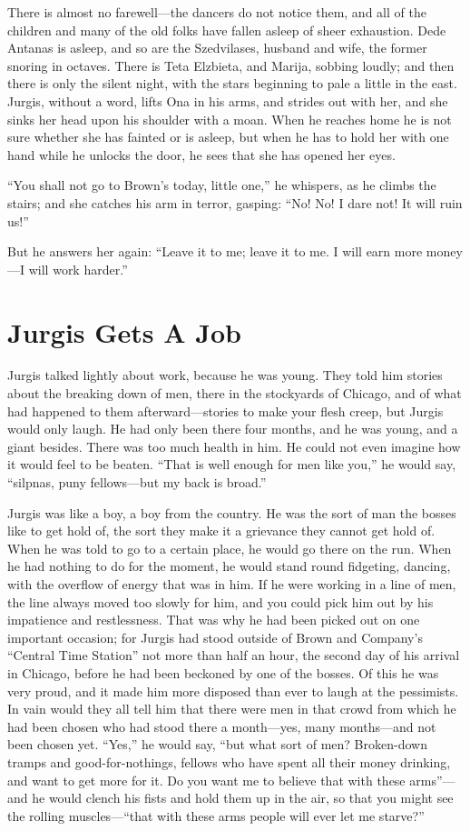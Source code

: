 \documentclass[
]{book}
\theoremstyle{definition}
\theoremstyle{definition}
\theoremstyle{definition}
\theoremstyle{definition}
\theoremstyle{remark}
\begin{document}
There is almost no farewell---the dancers do not notice them, and all of the children and many of the old folks have fallen asleep of sheer exhaustion. Dede Antanas is asleep, and so are the Szedvilases, husband and wife, the former snoring in octaves. There is Teta Elzbieta, and Marija, sobbing loudly; and then there is only the silent night, with the stars beginning to pale a little in the east. Jurgis, without a word, lifts Ona in his arms, and strides out with her, and she sinks her head upon his shoulder with a moan. When he reaches home he is not sure whether she has fainted or is asleep, but when he has to hold her with one hand while he unlocks the door, he sees that she has opened her eyes.

``You shall not go to Brown's today, little one,'' he whispers, as he climbs the stairs; and she catches his arm in terror, gasping: ``No! No! I dare not! It will ruin us!''

But he answers her again: ``Leave it to me; leave it to me. I will earn more money---I will work harder.''

\chapter{Jurgis Gets A Job}\label{jurgis-gets-a-job}

Jurgis talked lightly about work, because he was young. They told him stories about the breaking down of men, there in the stockyards of Chicago, and of what had happened to them afterward---stories to make your flesh creep, but Jurgis would only laugh. He had only been there four months, and he was young, and a giant besides. There was too much health in him. He could not even imagine how it would feel to be beaten. ``That is well enough for men like you,'' he would say, ``silpnas, puny fellows---but my back is broad.''

Jurgis was like a boy, a boy from the country. He was the sort of man the bosses like to get hold of, the sort they make it a grievance they cannot get hold of. When he was told to go to a certain place, he would go there on the run. When he had nothing to do for the moment, he would stand round fidgeting, dancing, with the overflow of energy that was in him. If he were working in a line of men, the line always moved too slowly for him, and you could pick him out by his impatience and restlessness. That was why he had been picked out on one important occasion; for Jurgis had stood outside of Brown and Company's ``Central Time Station'' not more than half an hour, the second day of his arrival in Chicago, before he had been beckoned by one of the bosses. Of this he was very proud, and it made him more disposed than ever to laugh at the pessimists. In vain would they all tell him that there were men in that crowd from which he had been chosen who had stood there a month---yes, many months---and not been chosen yet. ``Yes,'' he would say, ``but what sort of men? Broken-down tramps and good-for-nothings, fellows who have spent all their money drinking, and want to get more for it. Do you want me to believe that with these arms''---and he would clench his fists and hold them up in the air, so that you might see the rolling muscles---``that with these arms people will ever let me starve?''
\end{document}
